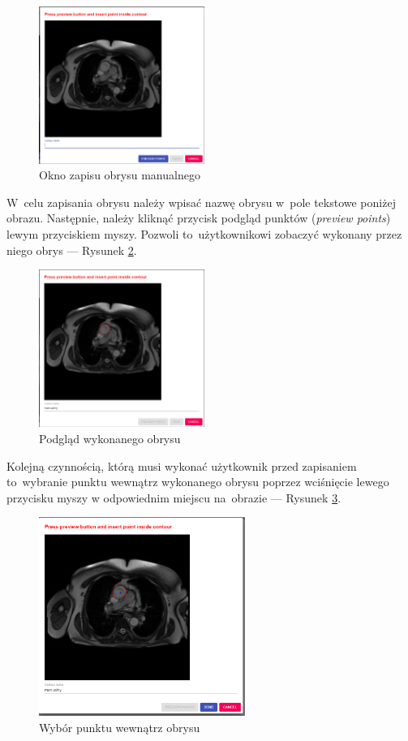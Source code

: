 \documentclass[a4paper,11pt,twoside,openright]{report}
\theoremstyle{definition}
\begin{document}
\begin{figure}[h!]
	\center
	\includegraphics[width=0.48\textwidth]{6}
	\caption{Okno zapisu obrysu manualnego}
    	\label{fig:6}
\end{figure}

W~celu zapisania obrysu należy wpisać nazwę obrysu w~pole tekstowe poniżej obrazu.
Następnie, należy kliknąć przycisk podgląd punktów (\textit{preview points})
lewym przyciskiem myszy. Pozwoli to~użytkownikowi zobaczyć wykonany przez niego
obrys --- Rysunek \ref{fig:7}.

\begin{figure}[h!]
	\center
	\includegraphics[width=0.48\textwidth]{7}
	\caption{Podgląd wykonanego obrysu}
    	\label{fig:7}
\end{figure}

Kolejną czynnością, którą musi wykonać użytkownik przed zapisaniem to~wybranie
punktu wewnątrz wykonanego obrysu poprzez wciśnięcie lewego przycisku myszy w
odpowiednim miejscu na~obrazie --- Rysunek \ref{fig:8}.

\pagebreak

\begin{figure}[h!]
	\center
	\includegraphics[width=0.6\textwidth]{8}
	\caption{Wybór punktu wewnątrz obrysu}
    	\label{fig:8}
\end{figure}
\end{document}
